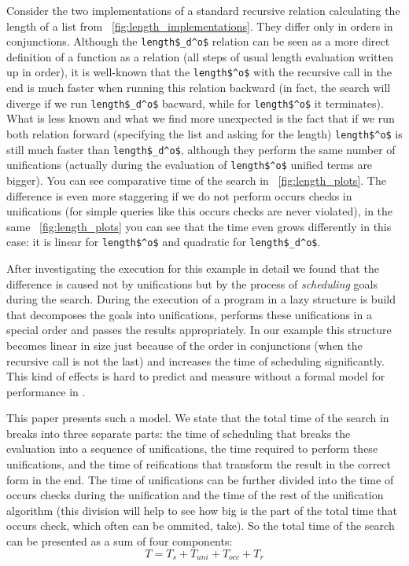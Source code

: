 Consider the two implementations of a standard recursive relation calculating the length of a list from \figureword~\ref{fig:length_implementations}. They differ only in orders in conjunctions. Although the \lstinline|length$_d^o$| relation can be seen as a more direct definition of a function as a relation (all steps of usual length evaluation written up in order), it is well-known that the \lstinline|length$^o$| with the recursive call in the end is much faster when running this relation backward (in fact, the search will diverge if we run \lstinline|length$_d^o$| bacward, while for \lstinline|length$^o$| it terminates). What is less known and what we find more unexpected is the fact that if we run both relation forward (specifying the list and asking for the length) \lstinline|length$^o$| is still much faster than \lstinline|length$_d^o$|, although they perform the same number of unifications (actually during the evaluation of \lstinline|length$^o$| unified terms are bigger). You can see comparative time of the search in \figureword~\ref{fig:length_plots}. The difference is even more staggering if we do not perform occurs checks in unifications (for simple queries like this occurs checks are never violated), in the same \figureword~\ref{fig:length_plots} you can see that the time even grows differently in this case: it is linear for \lstinline|length$^o$| and quadratic for \lstinline|length$_d^o$|.

After investigating the execution for this example in detail we found that the difference is caused not by unifications but by the process of \emph{scheduling} goals during the search. During the execution of a program in \mK a lazy structure is build that decomposes the goals into unifications, performs these unifications in a special order and passes the results appropriately. In our example this structure becomes linear in size just because of the order in conjunctions (when the recursive call is not the last) and increases the time of scheduling significantly. This kind of effects is hard to predict and measure without a formal model for performance in \mK.

This paper presents such a model. We state that the total time of the search in \mK breaks into three separate parts: the time of scheduling that breaks the evaluation into a sequence of unifications, the time required to perform these unifications, and the time of reifications that transform the result in the correct form in the end. The time of unifications can be further divided into the time of occurs checks during the unification and the time of the rest of the unification algorithm (this division will help to see how big is the part of the total time that occurs check, which often can be ommited, take). So the total time of the search can be presented as a sum of four components: \[ T = T_s + T_{uni} + T_{occ} + T_r \]

